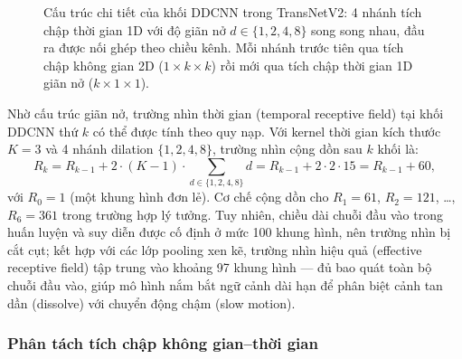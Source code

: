 \begin{figure}[H]
{
    }
    \caption[Cấu trúc khối DDCNN trong TransNetV2]{Cấu trúc chi tiết của khối DDCNN trong TransNetV2: 4 nhánh tích chập thời gian 1D với độ giãn nở $d \in \{1,2,4,8\}$ song song nhau, đầu ra được nối ghép theo chiều kênh. Mỗi nhánh trước tiên qua tích chập không gian 2D ($1\times k\times k$) rồi mới qua tích chập thời gian 1D giãn nở ($k\times 1\times 1$).}
    \label{fig:ddcnn_block}
\end{figure}

Nhờ cấu trúc giãn nở, trường nhìn thời gian (temporal receptive field) tại khối DDCNN thứ $k$ có thể được tính theo quy nạp. Với kernel thời gian kích thước $K = 3$ và 4 nhánh dilation $\{1, 2, 4, 8\}$, trường nhìn cộng dồn sau $k$ khối là:
\begin{equation}
    R_k = R_{k-1} + 2 \cdot (K - 1) \cdot \sum_{d \in \{1,2,4,8\}} d
    = R_{k-1} + 2 \cdot 2 \cdot 15 = R_{k-1} + 60,
    \label{eq:receptive_field}
\end{equation}
với $R_0 = 1$ (một khung hình đơn lẻ). Cơ chế cộng dồn cho $R_1 = 61$, $R_2 = 121$, \dots, $R_6 = 361$ trong trường hợp lý tưởng. Tuy nhiên, chiều dài chuỗi đầu vào trong huấn luyện và suy diễn được cố định ở mức 100 khung hình, nên trường nhìn bị cắt cụt; kết hợp với các lớp pooling xen kẽ, trường nhìn hiệu quả (effective receptive field) tập trung vào khoảng 97 khung hình — đủ bao quát toàn bộ chuỗi đầu vào, giúp mô hình nắm bắt ngữ cảnh dài hạn để phân biệt cảnh tan dần (dissolve) với chuyển động chậm (slow motion).

\subsubsection{Phân tách tích chập không gian–thời gian}
\label{subsubsec:factorized_conv}


